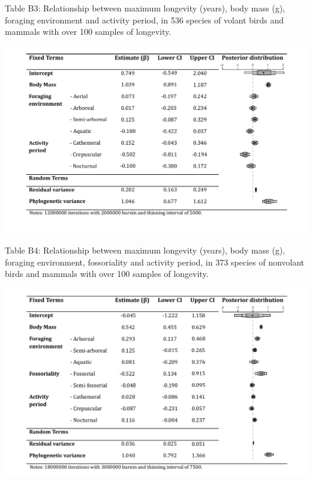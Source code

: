 \begin{table}[h]
  \caption[Table B3.]{Table B3: Relationship between maximum longevity (years), body mass (g), foraging environment and activity period, in 536 species of volant birds and mammals with over 100 samples of longevity.}
  \label{tbl:Table B3.}
  \includegraphics[width=\linewidth]{ch3-longevity-appendix/Table_B3.pdf}
\end{table}


\begin{table}[h]
  \caption[Table B4.]{Table B4: Relationship between maximum longevity (years), body mass (g), foraging environment, fossoriality and activity period, in 373 species of nonvolant birds and mammals with over 100 samples of longevity.}
  \label{tbl:Table B4.}
  \includegraphics[width=\linewidth]{ch3-longevity-appendix/Table_B4.pdf}
\end{table}



